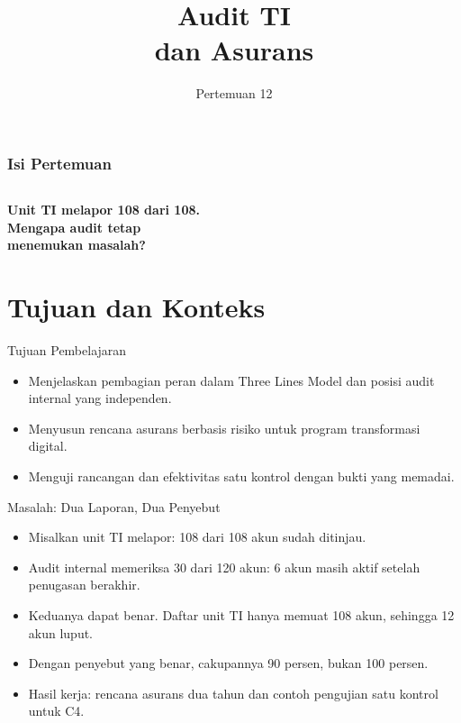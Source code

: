 \documentclass[aspectratio=169, table, 12pt]{beamer}
\title{\Huge Audit TI\\ \vspace{10pt} dan Asurans}
\date{Pertemuan 12}
\begin{document}
\frame{\titlepage}

\begin{frame}
  \frametitle{Isi Pertemuan}
  \vspace{14pt}
  \begin{columns}[t]
    {\small\tableofcontents[sections={1-5}]}

    {\small\tableofcontents[sections={6-10}]}
  \end{columns}
\end{frame}

\begin{frame}{\hfill}
  \centering
  \Huge{\textbf{Unit TI melapor 108 dari 108.\\Mengapa audit tetap\\menemukan masalah?}}
\end{frame}

\section{Tujuan dan Konteks}

\begin{frame}{{\Large Tujuan Pembelajaran}}
  \vspace{10pt}
  \begin{itemize}
    \item Menjelaskan pembagian peran dalam Three Lines Model dan posisi audit internal yang
          independen.
    \item Menyusun rencana asurans berbasis risiko untuk program transformasi digital.
    \item Menguji rancangan dan efektivitas satu kontrol dengan bukti yang memadai.
  \end{itemize}
\end{frame}

\begin{frame}{{\Large Masalah: Dua Laporan, Dua Penyebut}}
  \vspace{6pt}
  \small
  \begin{itemize}
    \item Misalkan unit TI melapor: 108 dari 108 akun sudah ditinjau.
    \item Audit internal memeriksa 30 dari 120 akun: 6 akun masih aktif setelah penugasan berakhir.
    \item Keduanya dapat benar. Daftar unit TI hanya memuat 108 akun, sehingga 12 akun luput.
    \item Dengan penyebut yang benar, cakupannya 90 persen, bukan 100 persen.
    \item Hasil kerja: rencana asurans dua tahun dan contoh pengujian satu kontrol untuk C4.
  \end{itemize}
\end{frame}
\end{document}
